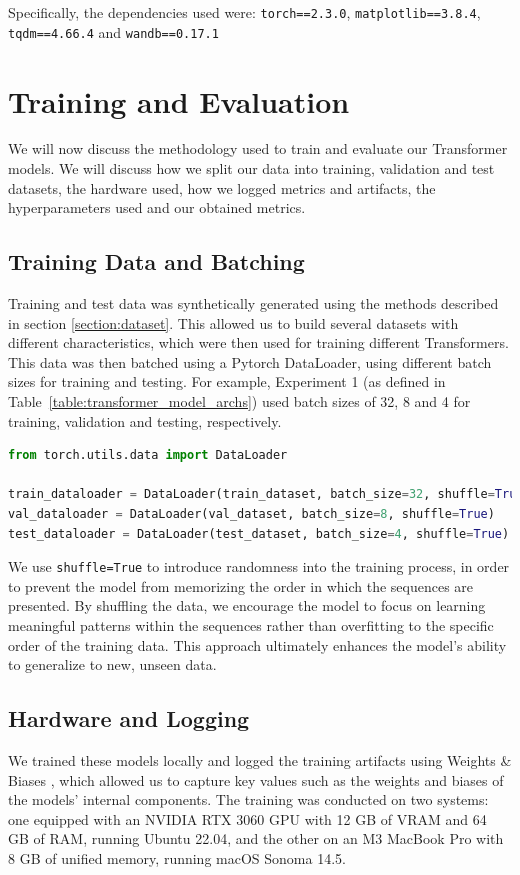 Specifically, the dependencies used were: \verb|torch==2.3.0|, \verb|matplotlib==3.8.4|, \verb|tqdm==4.66.4| and \verb|wandb==0.17.1|

\section{Training and Evaluation}

We will now discuss the methodology used to train and evaluate our Transformer models. We will discuss how we split our data into training, validation and test datasets, the hardware used, how we logged metrics and artifacts, the hyperparameters used and our obtained metrics.

\subsection{Training Data and Batching}

Training and test data was synthetically generated using the methods described in section \ref{section:dataset}. This allowed us to build several datasets with different characteristics, which were then used for training different Transformers. This data was then batched using a Pytorch DataLoader, using different batch sizes for training and testing. For example, Experiment 1 (as defined in Table~\ref{table:transformer_model_archs}) used batch sizes of 32, 8 and 4 for training, validation and testing, respectively.

\begin{lstlisting}[language=Python, caption=DataLoader definition for Experiment 1]
from torch.utils.data import DataLoader

train_dataloader = DataLoader(train_dataset, batch_size=32, shuffle=True)
val_dataloader = DataLoader(val_dataset, batch_size=8, shuffle=True)
test_dataloader = DataLoader(test_dataset, batch_size=4, shuffle=True)
\end{lstlisting}

We use \verb|shuffle=True| to introduce randomness into the training process, in order to prevent the model from memorizing the order in which the sequences are presented. By shuffling the data, we encourage the model to focus on learning meaningful patterns within the sequences rather than overfitting to the specific order of the training data. This approach ultimately enhances the model's ability to generalize to new, unseen data.

\subsection{Hardware and Logging}
We trained these models locally and logged the training artifacts using Weights \& Biases \cite{wandb}, which allowed us to capture key values such as the weights and biases of the models' internal components. The training was conducted on two systems: one equipped with an NVIDIA RTX 3060 GPU with 12 GB of VRAM and 64 GB of RAM, running Ubuntu 22.04, and the other on an M3 MacBook Pro with 8 GB of unified memory, running macOS Sonoma 14.5.

